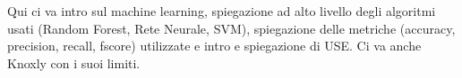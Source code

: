 Qui ci va intro sul machine learning, spiegazione ad alto livello degli algoritmi usati (Random Forest, Rete Neurale, SVM), spiegazione delle metriche (accuracy, precision, recall, fscore) utilizzate e intro e spiegazione di USE.\newline
Ci va anche Knoxly con i suoi limiti.



